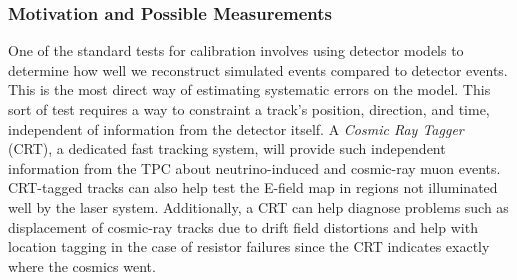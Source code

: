 
\subsubsection{Motivation and Possible Measurements}

One of the standard tests for calibration involves %
using detector models to determine how well we reconstruct simulated events compared to detector events. %
This is the most direct way of estimating systematic errors on the model. %
This sort of test requires a way to constraint a track's position, direction, and time, independent of information from the detector itself. A \textit{Cosmic Ray Tagger} (CRT), a dedicated fast tracking system, will provide such independent information from the TPC about neutrino-induced and cosmic-ray muon events. CRT-tagged tracks can also help test the E-field map in regions not illuminated well by the laser system. Additionally, a CRT can help diagnose problems such as displacement of cosmic-ray tracks due to drift field distortions and help with location tagging in the case of  resistor failures since %
the CRT indicates exactly where the cosmics went.

